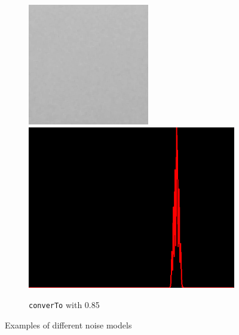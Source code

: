 \begin{figure}[H]
\begin{subfigure}[b]{0.28\textwidth}
        \begin{center}
        	\text{ }
        \end{center}
        \includegraphics[width=\textwidth]{img3/rect_0_85_contrast_5_0_85_final_img3.png}\\[0.1cm]
        \includegraphics[width=\textwidth]{img3/hist_rect_0_85_contrast_5_0_85_final_img3.png}
        \caption{\lstinline|converTo| with 0.85}
        \label{fig:img3_contrast}
    \end{subfigure}
    \caption{Examples of different noise models}
    \label{fig:noise_examples_img3}
\end{figure} 
